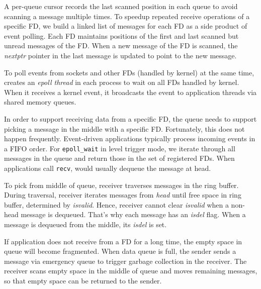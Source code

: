 A per-queue cursor records the last scanned position in each queue to avoid scanning a message multiple times.
To speedup repeated receive operations of a specific FD, we build a linked list of messages for each FD as a side product of event polling.
Each FD maintains positions of the first and last scanned but unread messages of the FD.
When a new message of the FD is scanned, the \emph{nextptr} pointer in the last message is updated to point to the new message.

To poll events from sockets and other FDs (handled by kernel) at the same time, \libipc{} creates an \textit{epoll thread} in each process to wait on all FDs handled by kernel. When it receives a kernel event, it broadcasts the event to application threads via shared memory queues. %

In order to support receiving data from a specific FD, the queue needs to support picking a message in the middle with a specific FD.
Fortunately, this does not happen frequently. Event-driven applications typically process incoming events in a FIFO order. For \texttt{epoll\_wait} in level trigger mode, we iterate through all messages in the queue and return those in the set of registered FDs. When applications call \texttt{recv}, \libipc{} would usually dequeue the message at head.

To pick from middle of queue, receiver traverses messages in the ring buffer. During traversal, receiver iterates messages from \textit{head} until free space in ring buffer, determined by \textit{isvalid}. Hence, receiver cannot clear \textit{isvalid} when a non-head message is dequeued. That's why each message has an \textit{isdel} flag. When a message is dequeued from the middle, its \textit{isdel} is set. %

If application does not receive from a FD for a long time, the empty space in queue will become fragmented.
When data queue is full, the sender sends a message via emergency queue to trigger garbage collection in the receiver.
The receiver scans empty space in the middle of queue and moves remaining messages, so that empty space can be returned to the sender.

